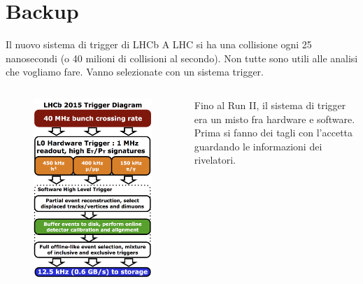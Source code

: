 \documentclass[
10pt,
aspectratio=169,
]{beamer}
\begin{document}
\section*{Backup}
\begin{frame}{Il nuovo sistema di trigger di LHCb}
A LHC si ha una collisione ogni 25 nanosecondi (o 40 milioni di collisioni al secondo). Non tutte sono utili alle analisi che vogliamo fare. Vanno selezionate con un sistema trigger.
\begin{columns}
    \begin{figure}
        \centering
        \includegraphics[width=0.9\linewidth]{figures/LHCb_Trigger_RunII_May2015.jpeg}
    \end{figure}
    \small
    Fino al Run II, il sistema di trigger era un misto fra hardware e software. Prima si fanno dei tagli con l'accetta guardando le informazioni dei rivelatori.
    

\end{columns}
\end{frame}
\end{document}

